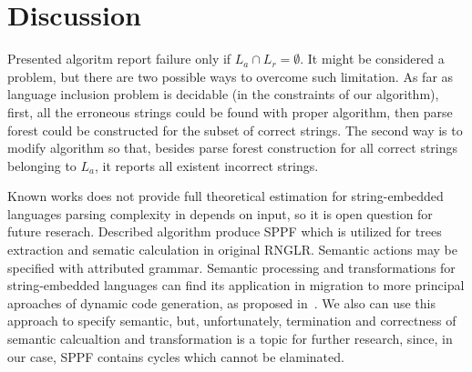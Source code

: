 \section{Discussion}

Presented algoritm report failure only if $L_a \cap L_r = \emptyset$. It might be considered a problem, but there are two possible ways to overcome such limitation. 
As far as language inclusion problem is decidable (in the constraints of our algorithm), first, all the erroneous strings could be found with proper algorithm, 
then parse forest could be constructed for the subset of correct strings. 
The second way is to modify algorithm so that, besides parse forest construction for all correct strings belonging to $L_a$, 
it reports all existent incorrect strings.

Known works does not provide full theoretical estimation for string-embedded languages parsing complexity in depends on input, so it is open question for future reserach.
Described algorithm produce SPPF which is utilized for trees extraction and sematic calculation in original RNGLR. Semantic actions may be specified with attributed grammar.
Semantic processing and transformations for string-embedded languages can find its application in migration to more principal aproaches of dynamic code generation, as proposed in~\cite{EvalToStaged}.
We also can use this approach to specify semantic, but, unfortunately, termination and correctness of semantic calcualtion and transformation is a topic for further research, 
since, in our case, SPPF contains cycles which cannot be elaminated. 

